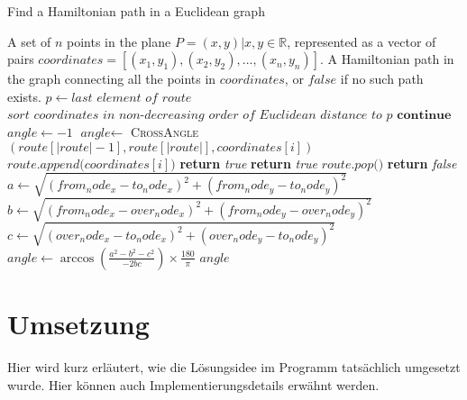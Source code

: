 \documentclass[a4paper,10pt,ngerman]{scrartcl}
\begin{document}
\begin{algorithm}[H]
\caption{Find a Hamiltonian path in a Euclidean graph}
\begin{algorithmic}[1]
\Require A set of $n$ points in the plane $P={(x,y)| x,y \in \mathbb{R}}$, represented as a vector of pairs $\textit{coordinates}=[(x_1,y_1), (x_2,y_2),..., (x_n,y_n)]$.
\Ensure A Hamiltonian path in the graph connecting all the points in $\textit{coordinates}$, or $\textit{false}$ if no such path exists.
\State $p\gets \textit{last element of } \textit{route}$
\State $\textit{sort } \textit{coordinates } \textit{in non-decreasing order of Euclidean distance to } p$
\EndIf
{}
\State $\textbf{continue}$
\EndIf
\State $\textit{angle}\gets -1$
\State $\textit{angle}\gets$ \textsc{CrossAngle}$(\textit{route}[|\textit{route}|-1], \textit{route}[|\textit{route}|], \textit{coordinates}[i])$
\EndIf
{}
\State $\textit{route.append(}\textit{coordinates}[i]\textit{)}$
\State \textbf{return} \textit{true}
\EndIf
{}
\State \textbf{return} \textit{true}
\Else
\State $\textit{route.pop()}$
\EndIf
\EndIf
\EndFor
\State \textbf{return} \textit{false}
\EndProcedure
\EndProcedure
{}
\State $\textit{a}\gets \sqrt{(from_node_x - to_node_x)^2 + (from_node_y - to_node_y)^2}$
\State $\textit{b}\gets \sqrt{(from_node_x - over_node_x)^2 + (from_node_y - over_node_y)^2}$
\State $\textit{c}\gets \sqrt{(over_node_x - to_node_x)^2 + (over_node_y - to_node_y)^2}$
\State $\textit{angle} \gets \arccos\left(\frac{a^2 - b^2 - c^2}{-2bc}\right) \times \frac{180}{\pi}$
\State \Return $angle$
\EndProcedure
\end{algorithmic}
\end{algorithm}



    \newpage
    \section{Umsetzung}\label{sec:umsetzung}
    Hier wird kurz erläutert, wie die Lösungsidee im Programm tatsächlich umgesetzt wurde.
    Hier können auch Implementierungsdetails erwähnt werden.
\end{document}
